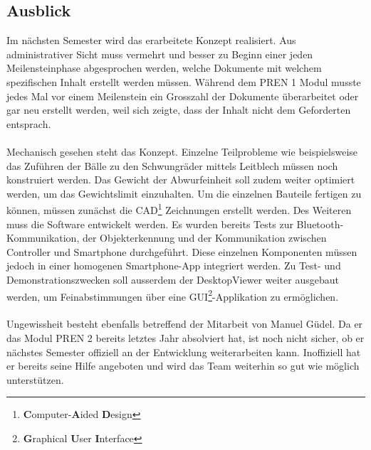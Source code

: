 \subsection{Ausblick}
Im nächsten Semester wird das erarbeitete Konzept realisiert. Aus administrativer 
Sicht muss vermehrt und besser zu Beginn einer jeden Meilensteinphase abgesprochen 
werden, welche Dokumente mit welchem spezifischen Inhalt erstellt werden müssen. 
Während dem PREN 1 Modul musste jedes Mal vor einem Meilenstein ein Grosszahl der 
Dokumente überarbeitet oder gar neu erstellt werden, weil sich zeigte, dass der 
Inhalt nicht dem Geforderten entsprach.\\
\\
Mechanisch gesehen steht das Konzept. Einzelne Teilprobleme wie beispielsweise 
das Zuführen der Bälle zu den Schwungräder mittels Leitblech müssen noch konstruiert 
werden. Das Gewicht der Abwurfeinheit soll zudem weiter optimiert werden, um das 
Gewichtslimit einzuhalten. Um die einzelnen Bauteile fertigen zu können, müssen 
zunächst die CAD\footnote{\textbf{C}omputer-\textbf{A}ided \textbf{D}esign} 
Zeichnungen erstellt werden. Des Weiteren muss die Software 
entwickelt werden. Es wurden bereits Tests zur Bluetooth-Kommunikation, der 
Objekterkennung und der Kommunikation zwischen Controller und Smartphone 
durchgeführt. Diese einzelnen Komponenten müssen jedoch in einer homogenen 
Smartphone-App integriert werden. Zu Test- und Demonstrationszwecken soll ausserdem 
der DesktopViewer weiter ausgebaut werden, um Feinabstimmungen über eine 
GUI\footnote{\textbf{G}raphical \textbf{U}ser \textbf{I}nterface}-Applikation zu 
ermöglichen.\\
\\
Ungewissheit besteht ebenfalls betreffend der Mitarbeit von Manuel Güdel. Da er 
das Modul PREN 2 bereits letztes Jahr absolviert hat, ist noch nicht sicher, ob 
er nächstes Semester offiziell an der Entwicklung weiterarbeiten kann. Inoffiziell 
hat er bereits seine Hilfe angeboten und wird das Team weiterhin so gut wie möglich 
unterstützen.
